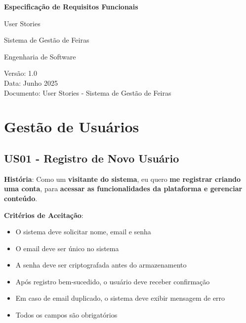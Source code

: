 \documentclass[12pt,a4paper]{article}
\begin{document}
\begin{titlepage}
\centering
\vspace*{2cm}

{\Huge\bfseries Especificação de Requisitos Funcionais}

\vspace{0.5cm}

{\LARGE User Stories}

\vspace{0.5cm}

{\large Sistema de Gestão de Feiras}

\vspace{2cm}

{\large Engenharia de Software}

\vfill

{\large Versão: 1.0\\
Data: Junho 2025\\
Documento: User Stories - Sistema de Gestão de Feiras}

\end{titlepage}

\newpage
\tableofcontents
\newpage

\section{Gestão de Usuários}

\subsection{US01 - Registro de Novo Usuário}

\textbf{História}: Como um \textbf{visitante do sistema}, eu quero \textbf{me registrar criando uma conta}, para \textbf{acessar as funcionalidades da plataforma e gerenciar conteúdo}.

\textbf{Critérios de Aceitação}:
\begin{itemize}
    \item O sistema deve solicitar nome, email e senha
    \item O email deve ser único no sistema
    \item A senha deve ser criptografada antes do armazenamento
    \item Após registro bem-sucedido, o usuário deve receber confirmação
    \item Em caso de email duplicado, o sistema deve exibir mensagem de erro
    \item Todos os campos são obrigatórios
\end{itemize}
\end{document}
